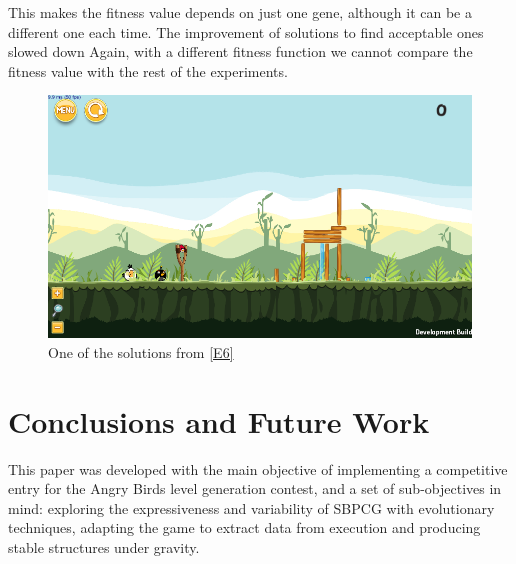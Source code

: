 \documentclass[sigconf]{acmart}
\begin{document}
This makes the fitness value depends on just one gene, although it can be a
different one each time. The improvement of solutions to find acceptable ones
slowed down %
Again, with a different fitness function we cannot compare the fitness
value with the rest of the experiments. 
 \begin{figure}
 	\centering
 	\includegraphics[scale=0.3]{E6.png}
 	\caption{One of the solutions from \ref{E6}}\label{f:e6}
 \end{figure}





%
\section{Conclusions and Future Work} 
\label{sec:conclusions}


This paper was developed with the main objective of implementing a
competitive entry for the Angry Birds level generation contest, and  a
set of sub-objectives in mind: exploring the expressiveness and variability of 
SBPCG with evolutionary techniques, adapting the game to extract data from 
execution and producing stable structures under gravity.
\end{document}
